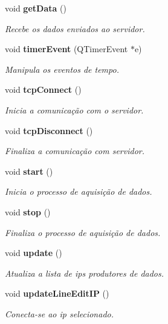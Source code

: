 \begin{DoxyCompactItemize}
\item 
\mbox{\label{class_main_window_a4a2ddf4cf2ec8e240cc340416b1df792}} 
void \textbf{ get\+Data} ()
\begin{DoxyCompactList}\small\item\em Recebe os dados enviados ao servidor. \end{DoxyCompactList}\item 
\mbox{\label{class_main_window_a9d08a694a5f9c532225754381b8011ea}} 
void \textbf{ timer\+Event} (Q\+Timer\+Event $\ast$e)
\begin{DoxyCompactList}\small\item\em Manipula os eventos de tempo. \end{DoxyCompactList}\item 
\mbox{\label{class_main_window_ac5b669957c442b6eb68573dacfce33e1}} 
void \textbf{ tcp\+Connect} ()
\begin{DoxyCompactList}\small\item\em Inicia a comunicação com o servidor. \end{DoxyCompactList}\item 
\mbox{\label{class_main_window_a4d22c4c7afc7ba0a2fa4c70515c85dda}} 
void \textbf{ tcp\+Disconnect} ()
\begin{DoxyCompactList}\small\item\em Finaliza a comunicação com servidor. \end{DoxyCompactList}\item 
\mbox{\label{class_main_window_a5edcbc314e782645cdf4db101eeb247d}} 
void \textbf{ start} ()
\begin{DoxyCompactList}\small\item\em Inicia o processo de aquisição de dados. \end{DoxyCompactList}\item 
\mbox{\label{class_main_window_a939e90ddfe07d74be87b351ca2171fb0}} 
void \textbf{ stop} ()
\begin{DoxyCompactList}\small\item\em Finaliza o processo de aquisição de dados. \end{DoxyCompactList}\item 
\mbox{\label{class_main_window_a128f71880d4b9683149023fc46fcc9f8}} 
void \textbf{ update} ()
\begin{DoxyCompactList}\small\item\em Atualiza a lista de ips produtores de dados. \end{DoxyCompactList}\item 
\mbox{\label{class_main_window_a0bc5dbb811cabab53521e722fec6d966}} 
void \textbf{ update\+Line\+Edit\+IP} ()
\begin{DoxyCompactList}\small\item\em Conecta-\/se ao ip selecionado. \end{DoxyCompactList}\end{DoxyCompactItemize}
